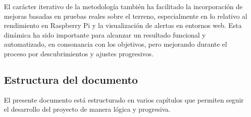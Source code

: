 \documentclass[11pt,a4paper,twoside]{report}
\begin{document}
El carácter iterativo de la metodología también ha facilitado la incorporación de mejoras basadas en pruebas reales sobre el terreno, especialmente en lo relativo al rendimiento en Raspberry Pi y la visualización de alertas en entornos web. Esta dinámica ha sido importante para alcanzar un resultado funcional y automatizado, en consonancia con los objetivos, pero mejorando durante el proceso por descubrimientos y ajustes progresivos.

\subsection*{Estructura del documento}

El presente documento está estructurado en varios capítulos que permiten seguir el desarrollo del proyecto de manera lógica y progresiva.
\end{document}
